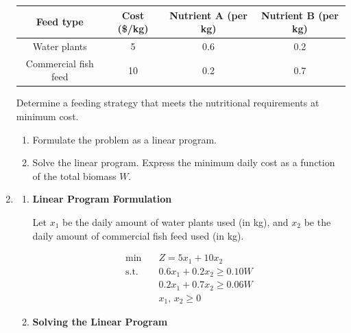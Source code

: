 \documentclass[12pt,a4paper]{article}
\makeatletter
\newtheorem*{solution}{Solution}
\theoremstyle{definition}
\renewenvironment{solution}[1][Solution] {\par\pushQED{\qed}\normalfont\topsep6\p@\@plus6\p@\relax\trivlist\item[\hskip\labelsep\bfseries#1\@addpunct{.}]\ignorespaces}{\popQED\endtrivlist\@endpefalse} \makeatother
\makeatother
\begin{document}
\begin{enumerate}
    
    \begin{center}
    \begin{tabular}{|c|c|c|c|}
    \hline
    Feed type & Cost (\$/kg) & Nutrient A (per kg) & Nutrient B (per kg) \\
    \hline
    Water plants & 5 & 0.6 & 0.2 \\
    Commercial fish feed & 10 & 0.2 & 0.7 \\
    \hline
    \end{tabular}
    \end{center}
    \vspace{-0.1cm}
    Determine a feeding strategy that meets the nutritional requirements at minimum cost.
    
    \begin{enumerate}
        \item Formulate the problem as a linear program.
        \item Solve the linear program. Express the minimum daily cost as a function of the total biomass $W$.
    \end{enumerate}

    \begin{solution}
        \begin{enumerate}
        \item \textbf{Linear Program Formulation}
    
        Let $x_1$ be the daily amount of water plants used (in kg), 
        and $x_2$ be the daily amount of commercial fish feed used (in kg).
        
        \begin{align*}
            \min \quad & Z = 5x_1 + 10x_2 \\
            \text{s.t.} \quad 
            & 0.6x_1 + 0.2x_2 \geq 0.10W \\
            & 0.2x_1 + 0.7x_2 \geq 0.06W \\
            & x_1,\, x_2 \geq 0
        \end{align*}
    
        \item \textbf{Solving the Linear Program}
    

\end{enumerate}
\end{solution}
\end{enumerate}
\end{document}
